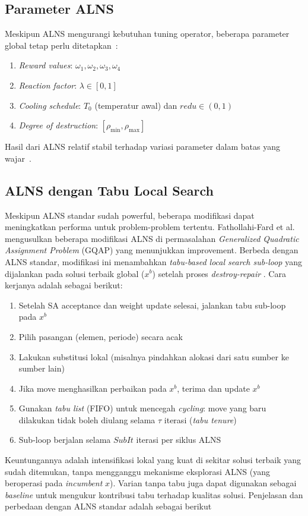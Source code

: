 \documentclass{file/TA-ITS}
\theoremstyle{definition}
\theoremstyle{definition}
\theoremstyle{plain}
\begin{document}
\subsection{Parameter ALNS}

Meskipun ALNS mengurangi kebutuhan tuning operator, beberapa parameter global tetap perlu ditetapkan~\cite{pisinger2018lns}:

\begin{enumerate}
    \item \textit{Reward values}: $\omega_1, \omega_2, \omega_3, \omega_4$ 
    \item \textit{Reaction factor}: $\lambda \in [0,1]$
    \item \textit{Cooling schedule}: $T_0$ (temperatur awal) dan $redu \in (0,1)$
    \item \textit{Degree of destruction}: $[\rho_{\min}, \rho_{\max}]$
\end{enumerate}
Hasil dari ALNS relatif stabil terhadap variasi parameter dalam batas yang wajar~\cite{pisinger2018lns}.

\subsection{ALNS dengan Tabu Local Search}

Meskipun ALNS standar sudah powerful, beberapa modifikasi dapat meningkatkan performa untuk problem-problem tertentu. Fathollahi-Fard et al.~\cite{fathollahifard2023alns} mengusulkan beberapa modifikasi ALNS di permasalahan \textit{Generalized Quadratic Assignment Problem} (GQAP) yang menunjukkan improvement. Berbeda dengan ALNS standar, modifikasi ini menambahkan \textit{tabu-based local search sub-loop} yang dijalankan pada solusi terbaik global ($x^b$) setelah proses \textit{destroy-repair} \cite{fathollahifard2023alns}. Cara kerjanya adalah sebagai berikut:

\begin{enumerate}
    \item Setelah SA acceptance dan weight update selesai, jalankan tabu sub-loop pada $x^b$
    \item Pilih pasangan (elemen, periode) secara acak
    \item Lakukan substitusi lokal (misalnya pindahkan alokasi dari satu sumber ke sumber lain)
    \item Jika move menghasilkan perbaikan pada $x^b$, terima dan update $x^b$
    \item Gunakan \textit{tabu list} (FIFO) untuk mencegah \textit{cycling}: move yang baru dilakukan tidak boleh diulang selama $\tau$ iterasi (\textit{tabu tenure})
    \item Sub-loop berjalan selama $SubIt$ iterasi per siklus ALNS
\end{enumerate}
Keuntungannya adalah intensifikasi lokal yang kuat di sekitar solusi terbaik yang sudah ditemukan, tanpa mengganggu mekanisme eksplorasi ALNS (yang beroperasi pada \textit{incumbent} $x$). Varian tanpa tabu juga dapat digunakan sebagai \textit{baseline} untuk mengukur kontribusi tabu terhadap kualitas solusi. Penjelasan dan perbedaan dengan ALNS standar adalah sebagai berikut
\end{document}

